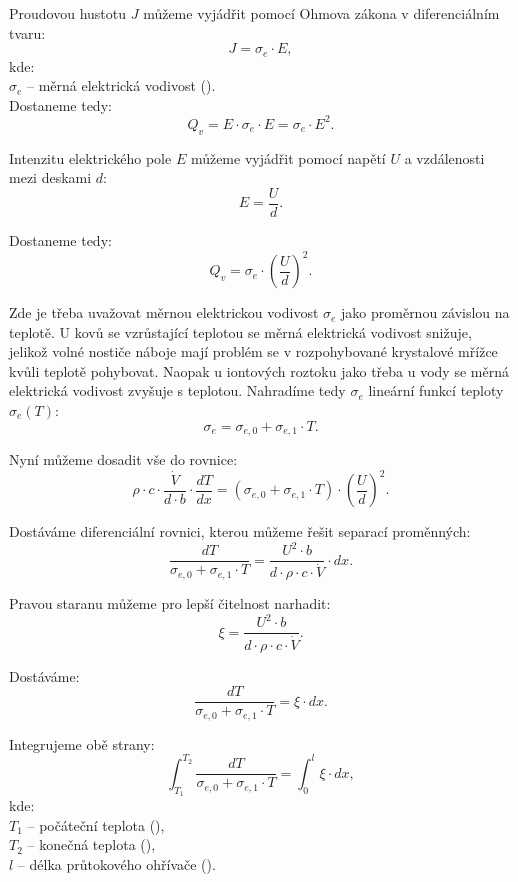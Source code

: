 \documentclass{article}
\begin{document}
Proudovou hustotu $J$ můžeme vyjádřit pomocí Ohmova zákona v diferenciálním tvaru:
$$
    J = \sigma_e \cdot E,
$$
kde:\\
$\sigma_e$ -- měrná elektrická vodivost (\ueqOHMandMinv).\\

Dostaneme tedy:
$$
    Q_v = E \cdot \sigma_e \cdot E = \sigma_e \cdot E^2.
$$

Intenzitu elektrického pole $E$ můžeme vyjádřit pomocí napětí $U$ a vzdálenosti mezi deskami $d$:
$$
    E = \frac{U}{d}.
$$

Dostaneme tedy:
$$
    Q_v = \sigma_e \cdot \left( \frac{U}{d} \right)^2.
$$

Zde je třeba uvažovat měrnou elektrickou vodivost $\sigma_e$ jako proměrnou závislou na teplotě. U kovů se vzrůstající teplotou se měrná elektrická vodivost snižuje, jelikož volné nostiče náboje mají problém se v rozpohybované krystalové mřížce kvůli teplotě pohybovat. Naopak u iontových roztoku jako třeba u vody se měrná elektrická vodivost zvyšuje s teplotou. Nahradíme tedy $\sigma_e$ lineární funkcí teploty $\sigma_e(T)$:
$$
    \sigma_e = \sigma_{e,0} + \sigma_{e,1} \cdot T.
$$

Nyní můžeme dosadit vše do rovnice:
$$
    \rho \cdot c \cdot \frac{\dot{V}}{d \cdot b} \cdot \frac{dT}{dx} = \left( \sigma_{e,0} + \sigma_{e,1} \cdot T \right) \cdot \left( \frac{U}{d} \right)^2.
$$

Dostáváme diferenciální rovnici, kterou můžeme řešit separací proměnných:
$$
    \frac{dT}{\sigma_{e,0} + \sigma_{e,1} \cdot T} = \frac{U^2 \cdot b}{d \cdot \rho \cdot c \cdot \dot{V}} \cdot dx.
$$

Pravou staranu můžeme pro lepší čitelnost narhadit:
$$
    \xi = \frac{U^2 \cdot b}{d \cdot \rho \cdot c \cdot \dot{V}}.
$$

Dostáváme:
$$
    \frac{dT}{\sigma_{e,0} + \sigma_{e,1} \cdot T} = \xi \cdot dx.
$$

Integrujeme obě strany:
$$
    \int_{T_1}^{T_2} \frac{dT}{\sigma_{e,0} + \sigma_{e,1} \cdot T} = \int_{0}^{l} \xi \cdot dx,
$$
kde:\\
$T_1$ -- počáteční teplota (\ueqK),\\
$T_2$ -- konečná teplota (\ueqK),\\
$l$ -- délka průtokového ohřívače (\ueqM).\\
\end{document}
